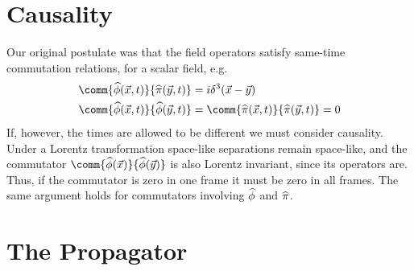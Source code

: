 \section{Causality}
\label{sec:causality}

Our original postulate was that the field operators satisfy same-time
commutation relations, for a scalar field, e.g.
\begin{align*}
  \comm{ \Op{\phi}(\vec{x}, t) }{ \Op{\pi} (\vec{y}, t) } &= i \delta^3(\vec{x} - \vec{y}) \\
  \comm{ \Op{\phi}(\vec{x}, t) }{ \Op{\phi}(\vec{y}, t) } &= \comm{ \Op{\pi}(\vec{x}, t) }{ \Op{\pi}(\vec{y}, t) } = 0
\end{align*}
If, however, the times are allowed to be different we must consider
causality. Under a Lorentz transformation space-like separations
remain space-like, and the commutator
$\comm{\Op{\phi}(\vec{x})}{\Op{\phi}(\vec{y})}$ is also Lorentz
invariant, since its operators are. Thus, if the commutator is zero in
one frame it must be zero in all frames. The same argument holds for
commutators involving ${\widehat{\phi}}$ and ${\widehat{\pi}}$.

\section{The Propagator}
\label{sec:propagator}

